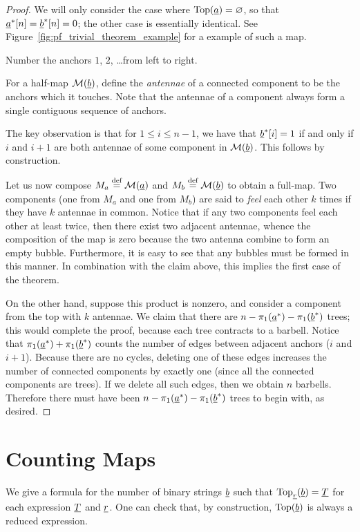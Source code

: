 \begin{proof}
	We will only consider the case where $\operatorname{Top}(\underline{a}) = \varnothing$, so that $\underline{a}^\ast[n] = \underline{b}^\ast[n] = 0$; the other case is essentially identical.  See Figure~\ref{fig:pf_trivial_theorem_example} for a example of such a map.

	Number the anchors $1$, $2$, \dots from left to right.

	For a half-map $\mathcal M(\underline{b})$, define the \emph{antennae} of a connected component to be the anchors which it touches.  Note that the antennae of a component always form a single contiguous sequence of anchors.

	The key observation is that for $1 \le i \le n-1$, we have that $\underline{b}^\ast[i] = 1$ if and only if $i$ and $i+1$ are both antennae of some component in $\mathcal M(\underline{b})$.  This follows by construction.

	Let us now compose $M_a \stackrel{\text{def}}{=} \mathcal M(\underline{a})$ and $M_b \stackrel{\text{def}}{=} \mathcal M(\underline{b})$ to obtain a full-map.  Two components (one from $M_a$ and one from $M_b$) are said to \emph{feel} each other $k$ times if they have $k$ antennae in common.  Notice that if any two components feel each other at least twice, then there exist two adjacent antennae, whence the composition of the map is zero because the two antenna combine to form an empty bubble.  Furthermore, it is easy to see that any bubbles must be formed in this manner.  In combination with the claim above, this implies the first case of the theorem.

	On the other hand, suppose this product is nonzero, and consider a component from the top with $k$ antennae.  We claim that there are $n - \pi_1(\underline{a}^\ast) - \pi_1(\underline{b}^\ast)$ trees; this would complete the proof, because each tree contracts to a barbell.  Notice that $\pi_1(\underline{a}^\ast) + \pi_1(\underline{b}^\ast)$ counts the number of edges between adjacent anchors ($i$ and $i+1$).  Because there are no cycles, deleting one of these edges increases the number of connected components by exactly one (since all the connected components are trees).  If we delete all such edges, then we obtain $n$ barbells.  Therefore there must have been $n - \pi_1(\underline{a}^\ast) - \pi_1(\underline{b}^\ast)$ trees to begin with, as desired.
\end{proof}

\section{Counting Maps}
\label{sec:res_count_maps}
We give a formula for the number of binary strings $\underline{b}$ such that $\operatorname{Top}_{\underline{r}}(\underline{b}) = \underline{T}$ for each expression $\underline{T}$ and $\underline{r}$.  One can check that, by construction, $\operatorname{Top}(\underline{b})$ is always a reduced expression.

